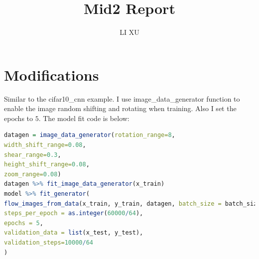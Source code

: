 \documentclass[12pt]{article}
\title{Mid2 Report}
\author{LI XU}
\begin{document}
\maketitle

\section{Modifications}
Similar to the cifar10\_cnn example. I use image\_data\_generator function to enable the image random shifting and rotating when training. Also I set the epochs to $5$. The model fit code is below:
\begin{lstlisting}[language=R,breaklines=true]
datagen = image_data_generator(rotation_range=8, 
width_shift_range=0.08, 
shear_range=0.3,
height_shift_range=0.08, 
zoom_range=0.08)
datagen %>% fit_image_data_generator(x_train)
model %>% fit_generator(
flow_images_from_data(x_train, y_train, datagen, batch_size = batch_size),
steps_per_epoch = as.integer(60000/64), 
epochs = 5, 
validation_data = list(x_test, y_test),
validation_steps=10000/64
)
\end{lstlisting}
\end{document}
